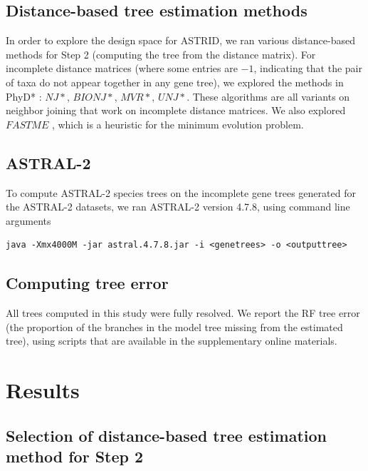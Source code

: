 \subsection{Distance-based tree estimation methods}
In order to explore the design space for ASTRID, we 
ran various distance-based methods for Step 2 (computing the
tree from the distance matrix).
For incomplete distance matrices (where some entries
are $-1$, indicating that the pair of taxa do not
appear together in any gene tree), we explored the
methods  in PhyD* \cite{phydstar}: $NJ*$, $BIONJ*$, $MVR*$,
$UNJ*$. These
algorithms are all variants on neighbor joining that work on incomplete distance matrices.
We also explored
$FASTME$ \cite{Desper2002}, which is a heuristic for the
minimum 
evolution problem.

\subsection{ASTRAL-2}
To compute ASTRAL-2 species trees on the incomplete gene trees
generated for the ASTRAL-2 datasets, 
we ran ASTRAL-2 version 4.7.8, using command line arguments 
\begin{verbatim}
java -Xmx4000M -jar astral.4.7.8.jar -i <genetrees> -o <outputtree>
\end{verbatim}

\subsection{Computing tree error}
All trees computed in this study were fully resolved. 
We report the RF tree error (the proportion of the
branches in the model tree missing from the estimated tree),
using scripts that 
are available in the supplementary online
materials. 

\section{Results}


\subsection{Selection of distance-based tree estimation method for Step 2}

